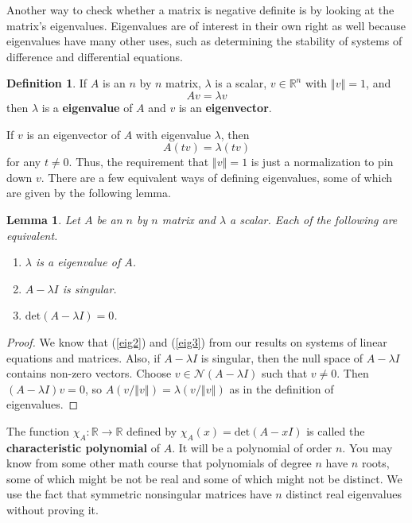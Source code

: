 \documentclass[12pt,reqno]{amsart}
\newtheorem{lemma}{Lemma}[section]
\theoremstyle{definition}
\newtheorem{definition}{Definition}[section]
\def\R{\mathbb{R}}
\newcommand{\norm}[1]{\left\Vert {#1} \right\Vert}
\renewcommand{\det}{\mathrm{det}}
\renewcommand{\to}{{\rightarrow}}
\begin{document}
Another way to check whether a matrix is negative definite is by
looking at the matrix's eigenvalues. Eigenvalues are of interest in
their own right as well because eigenvalues have many other uses, such
as determining the stability of systems of difference and differential
equations. 
\begin{definition}
  If $A$ is an $n$ by $n$ matrix, $\lambda$ is a scalar, $v \in \R^n$
  with $\norm{v} = 1$, 
  and 
  \[ Av = \lambda v \]
  then $\lambda$ is a \textbf{eigenvalue} of $A$ and $v$ is an
  \textbf{eigenvector}. 
\end{definition}
If $v$ is an eigenvector of $A$ with eigenvalue $\lambda$, then 
\[ A(tv) = \lambda (tv) \]
for any $t \neq 0$. Thus, the requirement that $\norm{v} = 1$ is just
a normalization to pin down $v$. There are a few equivalent ways of
defining eigenvalues, some of which 
are given by the following lemma.
\begin{lemma}
  Let $A$ be an $n$ by $n$ matrix and $\lambda$ a scalar. Each of the
  following are equivalent.
  \begin{enumerate}
  \item\label{eig1} $\lambda$ is a eigenvalue of $A$.
  \item\label{eig2} $A - \lambda I$ is singular.
  \item\label{eig3} $\det(A - \lambda I ) = 0$.
  \end{enumerate}
\end{lemma}
\begin{proof}
  We know that (\ref{eig2}) and (\ref{eig3}) from our results on
  systems of linear equations and matrices. Also, if $A - \lambda I$
  is singular, then the null space of $A - \lambda I$ contains
  non-zero vectors. Choose $v \in \mathcal{N}(A-\lambda I)$ such that
  $v \neq 0$. Then $(A-\lambda I) v = 0$, so $A(v/\norm{v}) =
  \lambda(v/\norm{v})$ as in the definition of eigenvalues. 
\end{proof}
The function $\chi_A:\R\to\R$ defined by $\chi_A(x) = \det(A - x I)$
is called the \textbf{characteristic polynomial} of $A$. It will be a
polynomial of order $n$. You may know from some other math course that
polynomials of degree $n$ have $n$ roots, some of which might be
not be real and some of which might not be distinct. We use the fact
that symmetric nonsingular matrices have $n$ distinct real
eigenvalues without proving it.
\end{document}

